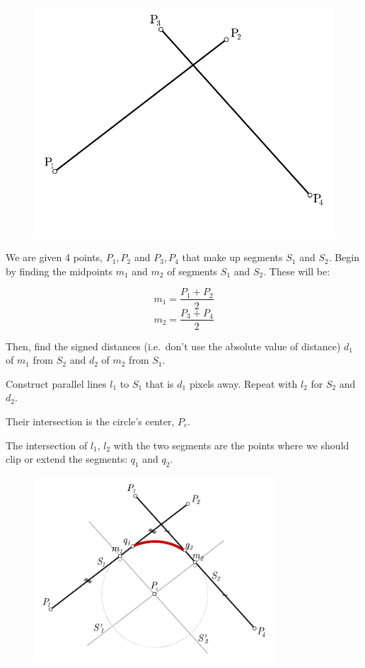 \documentclass[12pt,openany,a4,usenames,dvipsnames]{book}
\begin{document}
\begin{figure}[H]%
  \centering{}%
\includegraphics[width=\textwidth,keepaspectratio]{figures/fillet_1.pdf}%
\end{figure}%
%
\noindent{}We are given 4 points, $P_{1}, P_{2}$ and $P_{3}, P_{4}$ that make up segments $S_1$ and $S_2$.
Begin by finding the midpoints $m_1$ and $m_2$ of segments $S_1$ and $S_2$. These will be:

$$m_1 = \frac{P_1 + P_2}{2}$$
$$m_2 = \frac{P_3 + P_4}{2}$$

\noindent{}Then, find the signed distances (i.e.\ don't use the absolute value of distance) $d_1$ of $m_1$ from $S_2$ and $d_2$ of $m_2$ from $S_1$.

\noindent{}Construct parallel lines $l_1$ to $S_1$ that is $d_1$ pixels away. Repeat with $l_2$ for $S_2$ and $d_2$.

\noindent{}Their intersection is the circle's center, $P_c$.%

\noindent{}The intersection of $l_1$, $l_2$ with the two segments are the points where we should clip or extend the segments: $q_1$ and $q_2$.

\begin{figure}[H]
  \centering{}
\includegraphics[width=0.8\textwidth,keepaspectratio]{figures/fillet_2.pdf}
\end{figure}
\end{document}
